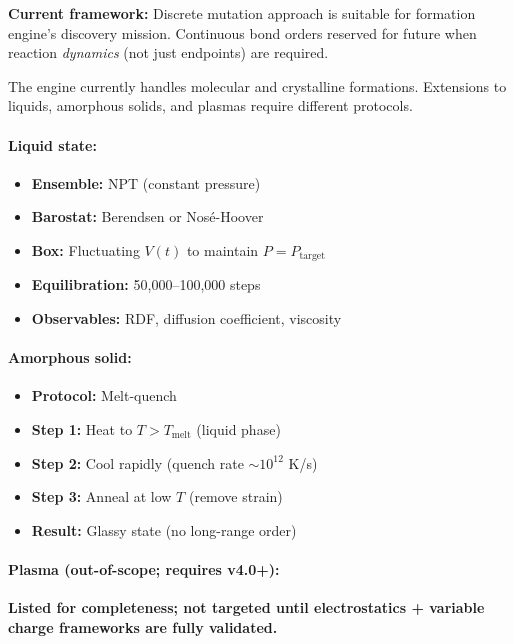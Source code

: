 \documentclass[11pt]{article}
\begin{document}
\textbf{Current framework:} Discrete mutation approach is suitable for formation engine's discovery mission. Continuous bond orders reserved for future when reaction \textit{dynamics} (not just endpoints) are required.


The engine currently handles molecular and crystalline formations. Extensions to liquids, amorphous solids, and plasmas require different protocols.

\paragraph{Liquid state:}

\begin{itemize}
\item \textbf{Ensemble:} NPT (constant pressure)
\item \textbf{Barostat:} Berendsen or Nosé-Hoover
\item \textbf{Box:} Fluctuating $V(t)$ to maintain $P = P_{\text{target}}$
\item \textbf{Equilibration:} 50,000--100,000 steps
\item \textbf{Observables:} RDF, diffusion coefficient, viscosity
\end{itemize}

\paragraph{Amorphous solid:}

\begin{itemize}
\item \textbf{Protocol:} Melt-quench
\item \textbf{Step 1:} Heat to $T > T_{\text{melt}}$ (liquid phase)
\item \textbf{Step 2:} Cool rapidly (quench rate $\sim 10^{12}$ K/s)
\item \textbf{Step 3:} Anneal at low $T$ (remove strain)
\item \textbf{Result:} Glassy state (no long-range order)
\end{itemize}

\paragraph{Plasma (out-of-scope; requires v4.0+):}

\textbf{Listed for completeness; not targeted until electrostatics + variable charge frameworks are fully validated.}
\end{document}
